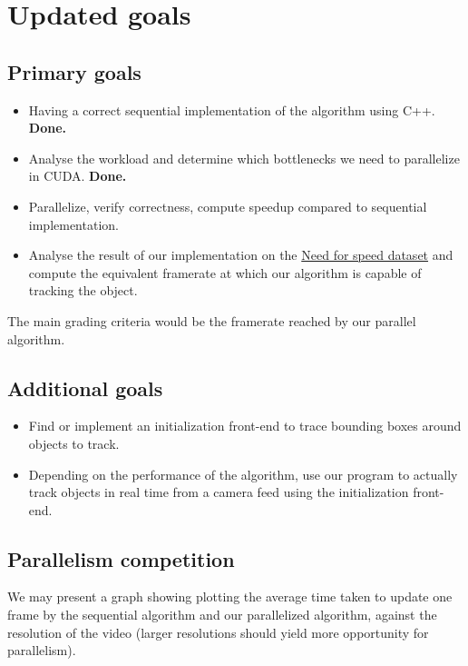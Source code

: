 \documentclass[11pt,english,letter]{article}
\begin{document}
\section{Updated goals}

\subsection{Primary goals}

\begin{itemize}
    \item Having a correct sequential implementation of the algorithm using C++. \textbf{Done.}
    \item Analyse the workload and determine which bottlenecks we need to parallelize in CUDA. \textbf{Done.}
    \item Parallelize, verify correctness, compute speedup compared to sequential implementation.
    \item Analyse the result of our implementation on the \href{http://ci2cv.net/nfs/index.html}{Need for speed dataset} and compute the equivalent framerate at which our algorithm is capable of tracking the object.
\end{itemize}

The main grading criteria would be the framerate reached by our parallel algorithm.

\subsection{Additional goals}

\begin{itemize}
    \item Find or implement an initialization front-end to trace bounding boxes around objects to track.
    \item Depending on the performance of the algorithm, use our program to actually track objects in real time from a camera feed using the initialization front-end.
\end{itemize}

\subsection{Parallelism competition}

We may present a graph showing plotting the average time taken to update one frame by the sequential algorithm and our parallelized algorithm, against the resolution of the video (larger resolutions should yield more opportunity for parallelism).
\end{document}

